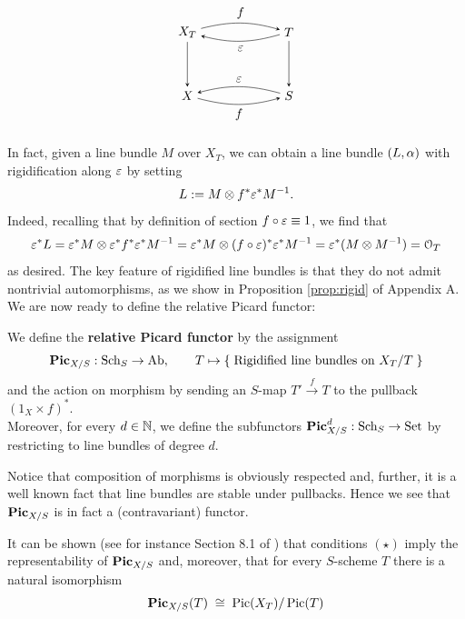 	\begin{equation*}
	\begin{tikzpicture}[node distance=5em, auto] %
		\node (A) 															{$X_T$};
		\node (B) 	[right of=A, xshift=3em]		{$T$};
	  \node (C) 	[below of=A] 								{$X$};
	  \node (D) 	[right of=C, xshift=3em] 		{$S$};
	  \draw[-stealth, bend left=15, looseness=1]						(A)		to node {$f$} 			(B);
	  \draw[-stealth, bend left=15, looseness=1]						(B)		to node {$\eps$} 	(A);
	  \draw[-stealth]																				(A)		to node {} (C);
	  \draw[-stealth]																				(B)		to node {} (D);
	  \draw[-stealth, bend right=15, looseness=1, swap]			(D)		to node {$\eps$}		(C);
	  \draw[-stealth, bend right=15, looseness=1, swap]			(C)		to node {$f$} 			(D);
	\end{tikzpicture}
	\end{equation*}

	In fact, given a line bundle $M$ over $X_T$, we can obtain a line bundle $(L,\alpha)$ with rigidification along $\varepsilon$ by setting
	$$ L:= M\otimes f^* \varepsilon^* M^{-1} . $$
	Indeed, recalling that by definition of section $f\circ\varepsilon \equiv 1$, we find that
	$$ 
	\varepsilon^* L 
	= 
	\varepsilon^*M\otimes \varepsilon^* f^* \varepsilon^* M^{-1} 
	= 
	\varepsilon^*M\otimes (f\circ\varepsilon)^* \varepsilon^* M^{-1}
	=
	\varepsilon^* (M\otimes M^{-1})
	=
	\mathcal{O}_T  
	$$
	as desired.
	The key feature of rigidified line bundles is that they do not admit nontrivial automorphisms, as we show in Proposition \ref{prop:rigid} of Appendix A.\\

	We are now ready to define the relative Picard functor:
	\begin{defi}
		We define the \textbf{relative Picard functor} by the assignment
		$$ \operatorname{\mathbf{Pic}}_{X/S}:\operatorname{Sch}_S \to \operatorname{Ab}, \qquad T \mapsto \left\{\;  \text{Rigidified line bundles}\text{ on } X_T/T  \; \right\} $$
		and the action on morphism by sending an $S$-map $T'\overset{f}\to T$ to the pullback $(1_X\times f)^*$.\\ 
		Moreover, for every $d\in \mathbb{N}$, we define the subfunctors $\operatorname{\mathbf{Pic}}_{X/S}^d:\operatorname{Sch}_S \to \operatorname{Set}$ by restricting to line bundles of degree $d$.
	\end{defi}
	\begin{rema}
		Notice that composition of morphisms is obviously respected and, further, it is a well known fact that line bundles are stable under pullbacks. Hence we see that $\operatorname{\mathbf{Pic}}_{X/S}$ is in fact a (contravariant) functor.
	\end{rema}	
	It can be shown (see for instance Section 8.1 of \cite{BOSCH}) that conditions $(\star)$ imply the representability of $\operatorname{\mathbf{Pic}}_{X/S}$ and, moreover, that for every $S$-scheme $T$ there is a natural isomorphism
	\begin{equation}\label{eq:PicXS}
		\operatorname{\mathbf{Pic}}_{X/S}(T) \;\cong\; \operatorname{Pic}(X_T) / \operatorname {\operatorname{Pic}}(T)
	\end{equation}

